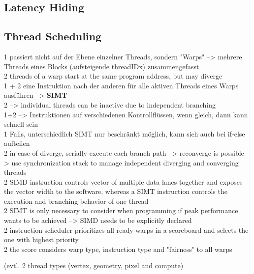 \documentclass[a4paper,12pt]{llncs}
\numberwithin{equation}{section}
\begin{document}
\subsection{Latency Hiding}
  
\subsection{Thread Scheduling}
        1 passiert nicht auf der Ebene einzelner Threads, sondern "Warps" --> mehrere Threads eines Blocks (aufsteigende threadIDx) zusammengefasst\\
        2 threads of a warp start at the same program address, but may diverge\\
        1 + 2 eine Instruktion nach der anderen für alle aktiven Threads eines Warps ausführen --> \textbf{SIMT}\\
         2 --> individual threads can be inactive due to independent branching\\
         1+2 --> Instruktionen auf verschiedenen Kontrollflüssen, wenn gleich, dann kann schnell sein\\
         	1 Falls, unterschiedlich SIMT nur beschränkt möglich, kann sich auch bei if-else aufteilen\\
         	2 in case of diverge, serially execute each branch path --> reconverge is possible --> use synchronization stack to manage independent diverging and converging threads\\
         	2 SIMD instruction controls vector of multiple data lanes together and exposes the vector width to the software, whereas a SIMT instruction controls the execution and branching behavior of one thread \\
         	2 SIMT is only necessary to consider when programming if peak performance wants to be achieved --> SIMD needs to be explicitly declared\\

        2 instruction scheduler prioritizes all ready warps in a scoreboard and selects the one with highest priority\\
        2 the score considers warp type, instruction type and "fairness" to all warps


(evtl. 2 thread types (vertex, geometry, pixel and compute)

         
\end{document}
